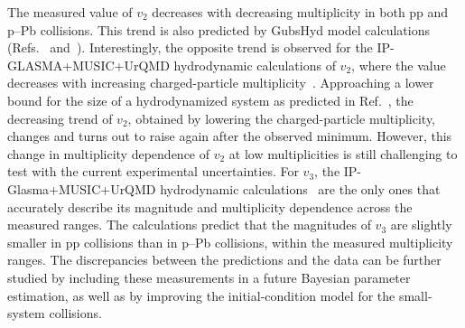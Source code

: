 The measured value of $v_{2}$ decreases with decreasing multiplicity in both pp and p--Pb collisions. This trend is also predicted by GubsHyd model calculations (Refs.~\cite{Taghavi:2019mqz} and~\cite{Weller:2017tsr}). Interestingly, the opposite trend is observed for the IP-GLASMA+MUSIC+UrQMD hydrodynamic calculations of $v_2$, where the value decreases with increasing charged-particle multiplicity~\cite{Schenke:2020mbo}.
Approaching a lower bound for the size of a hydrodynamized
system as predicted in Ref.~\cite{Taghavi:2019mqz}, 
the decreasing trend of $v_2$, obtained by lowering the charged-particle multiplicity, changes and turns out to raise again after the observed minimum. However, this change in multiplicity dependence of $v_2$ at low multiplicities is still challenging to test with the current experimental uncertainties. For $v_3$, the IP-Glasma+MUSIC+UrQMD hydrodynamic calculations~\cite{Schenke:2020mbo} are the only ones that accurately describe its magnitude and multiplicity dependence across the measured ranges. The calculations predict that the magnitudes of $v_3$ are slightly smaller in pp collisions than in p--Pb collisions, within the measured multiplicity ranges. The discrepancies between the predictions and the data can be further studied by including these measurements in a future Bayesian parameter estimation, as well as by improving the initial-condition model for the small-system collisions.